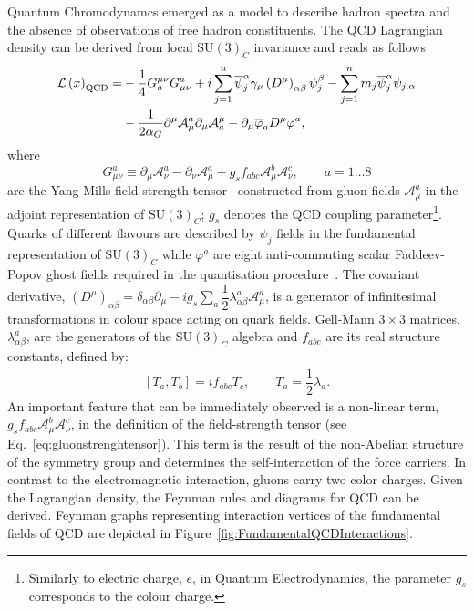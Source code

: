 Quantum Chromodynamcs emerged as a model to describe hadron spectra and the absence of observations of free hadron constituents. The QCD Lagrangian density can be derived from local $\mathrm{SU}\left(3\right)_{C}$ invariance and reads as follows
\begin{align}
 \mathcal{L}\left( x\right)_{\mathrm{QCD}}  = & -\dfrac{1}{4}G_a^{\mu\nu}G_{\mu\nu}^a + i\sum_{j=1}^n{\overline{\psi}^{\alpha}_j \gamma_\mu \left( D^\mu \right)_{\alpha\beta} \psi_j^\beta } - \sum_{j=1}^n{m_j\overline{\psi}^{\alpha}_j\psi_{j,\alpha}} \notag\\
					      & - \dfrac{1}{2\alpha_G} \partial^\mu \mathcal{A}^a_\mu \partial_\mu \mathcal{A}_a^\mu - \partial_\mu \overline{\varphi}_a D^\mu \varphi^a,
								\label{eq:qcdlagrangian}
\end{align}
where 
\begin{equation}
G_{\mu\nu}^a \equiv \partial_\mu \mathcal{A}^a_\nu - \partial_\nu \mathcal{A}^a_\mu + g_sf_{abc}\mathcal{A}^b_\mu \mathcal{A}^c_\nu , \qquad a=1 \ldots 8
\label{eq:gluonstrenghtensor}
\end{equation}
are the Yang-Mills field strength tensor~\cite{Yang:1954ek} constructed from gluon fields $\mathcal{A}^a_\mu$ in the adjoint representation of $\mathrm{SU}\left(3\right)_C$; $g_s$ denotes the QCD coupling parameter\footnote{Similarly to electric charge, $e$, in Quantum Electrodynamics, the parameter $g_s$ corresponds to the colour charge.}. Quarks of different flavours are described by $\psi_j$ fields in the fundamental representation of $\mathrm{SU}\left(3\right)_C$ while $\varphi^a$ are eight anti-commuting scalar Faddeev-Popov ghost fields required in the quantisation procedure~\cite{Faddeev:1967fc, DeWitt:1964yg}. The covariant derivative, $\left( D^\mu \right)_{\alpha\beta} = \delta_{\alpha\beta}\partial_\mu - ig_s\sum_a{\dfrac{1}{2}\lambda^a_{\alpha\beta}\mathcal{A}^a_\mu}$, is a generator of infinitesimal transformations in colour space acting on quark fields. Gell-Mann $3\times 3$ matrices, $\lambda^a_{\alpha\beta}$, are the generators of the $\mathrm{SU}\left(3\right)_C$ algebra and $f_{abc}$ are its real structure constants, defined by:
\begin{align}
 \left[T_a,T_b\right] = if_{abc}T_c,\qquad T_a = \dfrac{1}{2}\lambda_a.
\end{align}
An important feature that can be immediately observed is a non-linear term, $g_sf_{abc}\mathcal{A}^b_\mu \mathcal{A}^c_\nu$, in the definition of the field-strength tensor (see Eq.~\eqref{eq:gluonstrenghtensor}). This term is the result of the non-Abelian structure of the symmetry group and determines the self-interaction of the force carriers. In contrast to the electromagnetic interaction, gluons carry two color charges. Given the Lagrangian density, the Feynman rules and diagrams for QCD can be derived.  Feynman graphs representing interaction vertices of the fundamental fields of QCD are depicted in Figure~\ref{fig:FundamentalQCDInteractions}.
